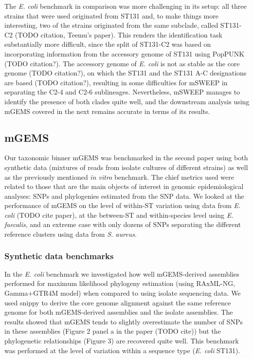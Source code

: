\documentclass[officiallayout]{tktla}
\begin{document}
The \textit{E. coli} benchmark in comparison was more challenging in
its setup: all three strains that were used originated from ST131 and,
to make things more interesting, two of the strains originated from
the same subclade, called ST131-C2 (TODO citation, Teemu's
paper). This renders the identification task substantially more
difficult, since the split of ST131-C2 was based on incorporating
information from the accessory genome of ST131 using PopPUNK (TODO
citation?). The accessory genome of \textit{E. coli} is not as stable
as the core genome (TODO citation?), on which the ST131 and the ST131
A-C designations are based (TODO citation?), resulting in some
difficulties for mSWEEP in separating the C2-4 and C2-6
sublineages. Nevertheless, mSWEEP manages to identify the presence of
both clades quite well, and the downstream analysis using mGEMS
covered in the next remains accurate in terms of its results.

\subsection{mGEMS}
\label{mgems-performance-benchmark}
Our taxonomic binner mGEMS was benchmarked in the second paper using
both synthetic data (mixtures of reads from isolate cultures of
different strains) as well as the previously mentioned \textit{in
  vitro} benchmark. The chief metrics used were related to those that
are the main objects of interest in genomic epidemiological analyses:
SNPs and phylogenies estimated from the SNP data. We looked at the
performance of mGEMS on the level of within-ST variation using data
from \textit{E. coli} (TODO cite paper), at the between-ST and
within-species level using \textit{E. faecalis}, and an extreme case
with only dozens of SNPs separating the different reference clusters
using data from \textit{S. aureus}.

\subsubsection{Synthetic data benchmarks}

In the \textit{E. coli} benchmark we investigated how well
mGEMS-derived assemblies performed for maximum likelihood phylogeny
estimation (using RAxML-NG, Gamma+GTR4M model) when compared to using
isolate sequencing data. We used snippy to derive the core genome
alignment against the same reference genome for both mGEMS-derived
assemblies and the isolate assemblies. The results showed that mGEMS
tends to slightly overestimate the number of SNPs in these assemblies
(Figure 2 panel a in the paper (TODO cite)) but the phylogenetic
relationships (Figure 3) are recovered quite well. This benchmark was
performed at the level of variation within a sequence type
(\textit{E. coli} ST131).
\end{document}
